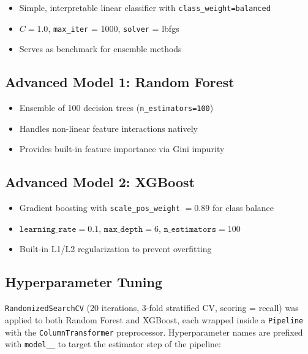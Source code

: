 \documentclass[12pt,a4paper]{article}
\begin{document}
\begin{itemize}
    \item Simple, interpretable linear classifier with \texttt{class\_weight=balanced}
    \item $C = 1.0$, \texttt{max\_iter} = 1000, \texttt{solver} = lbfgs
    \item Serves as benchmark for ensemble methods
\end{itemize}

\subsection{Advanced Model 1: Random Forest}

\begin{itemize}
    \item Ensemble of 100 decision trees (\texttt{n\_estimators=100})
    \item Handles non-linear feature interactions natively
    \item Provides built-in feature importance via Gini impurity
\end{itemize}

\subsection{Advanced Model 2: XGBoost}

\begin{itemize}
    \item Gradient boosting with \texttt{scale\_pos\_weight} $= 0.89$ for class balance
    \item $\texttt{learning\_rate} = 0.1$, $\texttt{max\_depth} = 6$, $\texttt{n\_estimators} = 100$
    \item Built-in L1/L2 regularization to prevent overfitting
\end{itemize}

\subsection{Hyperparameter Tuning}

\texttt{RandomizedSearchCV} (20 iterations, 3-fold stratified CV, scoring = recall) was applied to both Random Forest and XGBoost, each wrapped inside a \texttt{Pipeline} with the \texttt{ColumnTransformer} preprocessor.  Hyperparameter names are prefixed with \texttt{model\_\_} to target the estimator step of the pipeline:
\end{document}
